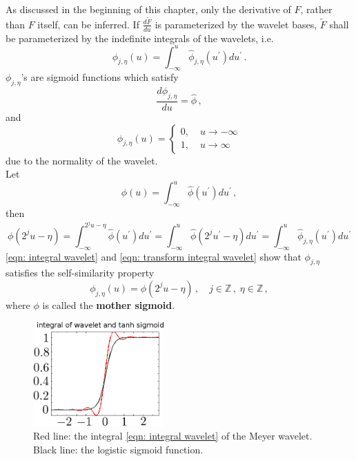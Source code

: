 As discussed in the beginning of this chapter, only the derivative of $F$, rather than 
$F$ itself, can be inferred.
If $\frac{d \tilde{F}}{du}$ is parameterized by the wavelet bases, 
$\tilde{F}$ shall be parameterized by the indefinite integrals of the wavelets, i.e.
\begin{equation}
    \phi_{j,\eta}(u) = \int_{-\infty}^u \hat{\phi}_{j,\eta}(u^\prime) du^\prime\,.
    \label{eqn: integral wavelet}
\end{equation}
$\phi_{j,\eta}$'s are sigmoid functions which satisfy
\begin{equation}
    \frac{d\phi_{j,\eta}}{du} = \hat{\phi}\,,
\end{equation}
and
\begin{equation}
    \phi_{j,\eta}(u) = \left\{
        \begin{split}
            0,&\; u\rightarrow -\infty\\
            1,&\; u\rightarrow \infty
        \end{split}\right.
\end{equation}
due to the normality of the wavelet.\\

Let 
\begin{equation}
    \phi(u) = \int_{-\infty}^u \hat{\phi}(u^\prime) du^\prime\,,
    \label{eqn: integral wavelet basis}
\end{equation}
then
\begin{equation}
    \phi(2^j u-\eta) = \int_{-\infty}^{2^j u-\eta} \hat{\phi}(u^\prime) du^\prime
    = \int_{-\infty}^{u} \hat{\phi} (2^j u^\prime - \eta) du^\prime=
    \int_{-\infty}^u \hat{\phi}_{j,\eta} (u^\prime) du^\prime
    \label{eqn: transform integral wavelet}
\end{equation}
\eqref{eqn: integral wavelet} and \eqref{eqn: transform integral wavelet} show that
$\phi_{j,\eta}$ satisfies the self-similarity property
\begin{equation}
    {\phi}_{j,\eta}(u) = {\phi}(2^j u-\eta) \,,\quad j\in \mathbb{Z} \,,\;\eta \in \mathbb{Z}\,,
    \label{eqn: self similar sigmoid}
\end{equation}
where $\phi$ is called the \textbf{mother sigmoid}.\\

\begin{figure}[Htbp]\begin{center}
    \includegraphics[width=5cm, height=4cm]{../basis_combined.png}
    \caption{Red line: the integral \eqref{eqn: integral wavelet} of the Meyer wavelet.
             Black line: the logistic sigmoid function.}
    \label{fig: sigmoid}
\end{center}\end{figure}


